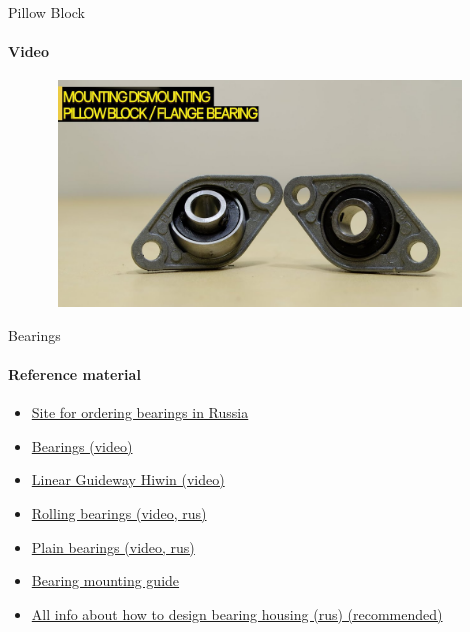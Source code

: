 \documentclass[aspectratio=169]{beamer}
\begin{document}
\begin{frame}[t]{Pillow Block}
    \framesubtitle{Video}
    \vspace{-0.6cm}
    \begin{figure}[H]
        \href{https://youtu.be/QCDovyEb7JM}{
            \centering\includegraphics[height=6cm,width=1\textwidth,keepaspectratio]{pillowblock_video.jpg}}
        \label{fig:pillowblock_video.jpg}
    \end{figure}
\end{frame}



\begin{frame}[t]{Bearings}
    \framesubtitle{Reference material}
        \begin{itemize}
            \item \href{https://shop.podshipnik.ru/}{Site for ordering bearings in Russia}
            \item \href{https://youtu.be/QhTI8CnRic8}{Bearings (video)}
            \item \href{https://youtu.be/V2GjmmUHGrg}{Linear Guideway Hiwin (video)}
            \item \href{https://youtu.be/xTqEc2vfIEY}{Rolling bearings (video, rus)}
            \item \href{https://youtu.be/Ptm3c5byXAY}{Plain bearings (video, rus)}
            \item \href{https://shop.eriks.co.uk/en/bearings-mounting-guide/}{Bearing mounting guide}
            \item \href{https://www.s-graciya.ru/upload/file/FAG/7-pr_pod_opor.pdf}{All info about how to design bearing housing (rus) (recommended)}
        \end{itemize}
    \end{frame}
\end{document}
